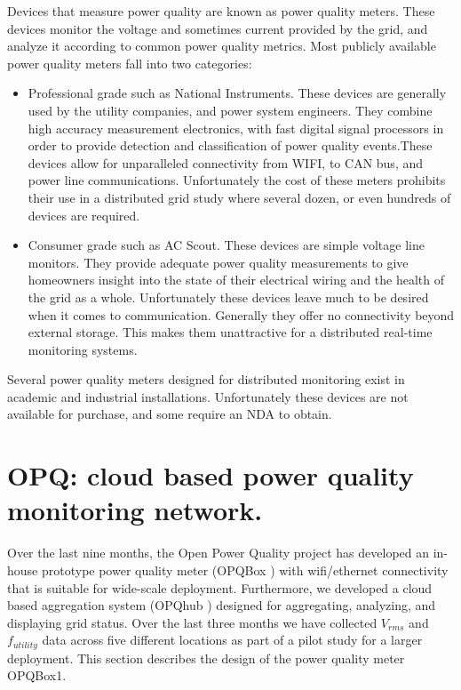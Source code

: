 Devices that measure power quality are known as power quality meters. These devices monitor the voltage and sometimes current provided by the grid, and analyze it according to common power quality metrics. Most publicly available power quality meters fall into two categories:

\begin{itemize}
\item Professional grade such as National Instruments. \cite{NI-device} These devices are generally used by the utility companies, and power system engineers. They combine high accuracy measurement electronics, with fast digital signal processors in order to provide detection and classification of power quality events.These devices allow for unparalleled connectivity from WIFI, to CAN bus, and power line communications.  Unfortunately the cost of these meters prohibits their use in a distributed grid study where several dozen, or even hundreds of devices are required.
\item Consumer grade such as AC Scout\textregistered. \cite{ACScout} These devices are simple voltage line monitors. They provide adequate power quality measurements to give homeowners insight into the state of their electrical wiring and the health of the grid as a whole. Unfortunately these devices leave much to be desired when it comes to communication. Generally they offer no connectivity beyond external storage. This makes them unattractive for a distributed real-time monitoring systems.
\end{itemize}

Several power quality meters designed for distributed monitoring exist in academic and industrial installations.\cite{fnet_main} Unfortunately these devices are not available for purchase, and some require an NDA to obtain.

\section{OPQ: cloud based power quality monitoring network.}

Over the last nine months, the Open Power Quality project \cite{OPQ} has developed an in-house prototype power quality meter (OPQBox \cite{OPQBox1Repository}) with wifi/ethernet connectivity that is suitable for wide-scale deployment. Furthermore, we developed a cloud based aggregation system (OPQhub \cite{OPQHubRepository}) designed for aggregating, analyzing, and displaying grid status. Over the last three months we have collected $V_{rms}$ and $f_{utility}$ data across five different locations as part of a pilot study for a larger deployment. This section describes the design of the power quality meter OPQBox1.

